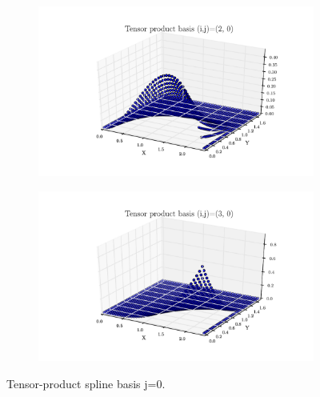 \documentclass[11pt,letterpaper]{article}
\begin{document}
\begin{figure}[!tbh]
\begin{subfigure}[b]{.6\textwidth}
    \includegraphics[width=\textwidth]{problem_2_2_2_0.pdf}
    \caption{}
    \label{fig2:label:c}
  \end{subfigure}
  \hfill
  \begin{subfigure}[b]{.6\textwidth}
    \includegraphics[width=\textwidth]{problem_2_2_3_0.pdf}
    \caption{}
    \label{fig2:label:d}
  \end{subfigure}
  \caption{Tensor-product spline basis j=0. }
  \end{figure}
\end{document}
